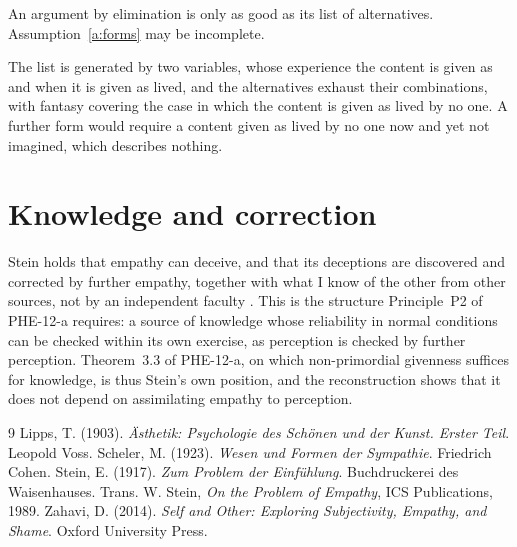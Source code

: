 \documentclass{situationist-preprint}
\begin{document}
\begin{objection}
An argument by elimination is only as good as its list of alternatives. Assumption~\ref{a:forms} may be incomplete.
\end{objection}

\begin{reply}
The list is generated by two variables, whose experience the content is given as and when it is given as lived, and the alternatives exhaust their combinations, with fantasy covering the case in which the content is given as lived by no one. A further form would require a content given as lived by no one now and yet not imagined, which describes nothing.
\end{reply}

\section{Knowledge and correction}

Stein holds that empathy can deceive, and that its deceptions are discovered and corrected by further empathy, together with what I know of the other from other sources, not by an independent faculty \citep[ch.~3]{Stein1917}. This is the structure Principle~P2 of PHE-12-a requires: a source of knowledge whose reliability in normal conditions can be checked within its own exercise, as perception is checked by further perception. Theorem~3.3 of PHE-12-a, on which non-primordial givenness suffices for knowledge, is thus Stein's own position, and the reconstruction shows that it does not depend on assimilating empathy to perception.

\begin{thebibliography}{9}\small
{} Lipps, T. (1903). \emph{\"Asthetik: Psychologie des Sch\"onen und der Kunst. Erster Teil}. Leopold Voss.
 Scheler, M. (1923). \emph{Wesen und Formen der Sympathie}. Friedrich Cohen.
 Stein, E. (1917). \emph{Zum Problem der Einf\"uhlung}. Buchdruckerei des Waisenhauses. Trans. W. Stein, \emph{On the Problem of Empathy}, ICS Publications, 1989.
 Zahavi, D. (2014). \emph{Self and Other: Exploring Subjectivity, Empathy, and Shame}. Oxford University Press.
\end{thebibliography}
\end{document}
